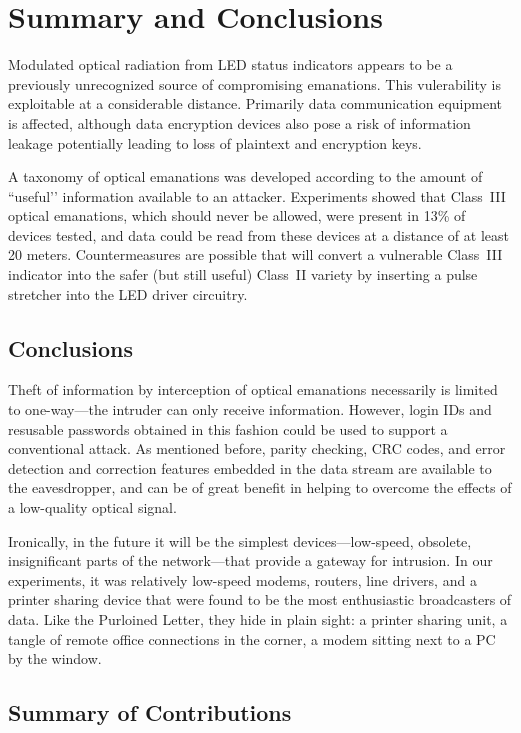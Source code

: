 \documentclass[twocolumn]{article}
\begin{document}
\section{Summary and Conclusions}

Modulated optical radiation from LED status indicators appears to be a previously unrecognized source of compromising emanations.  This vulerability is exploitable at a considerable distance.  Primarily data communication equipment is affected, although data encryption devices also pose a risk of information leakage potentially leading to loss of plaintext and encryption keys.

A taxonomy of optical emanations was developed according to the amount of ``useful’’ information available to an attacker.  Experiments showed that Class~III optical emanations, which should never be allowed, were present in 13\% of devices tested, and data could be read from these devices at a distance of at least 20 meters.  Countermeasures are possible that will convert a vulnerable Class~III indicator into the safer (but still useful) Class~II variety by inserting a pulse stretcher into the LED driver circuitry.

\subsection{Conclusions}

Theft of information by interception of optical emanations necessarily is limited to one-way---the intruder can only receive information.  However, login IDs and resusable passwords obtained in this fashion could be used to support a conventional attack.  As mentioned before, parity checking, CRC codes, and error detection and correction features embedded in the data stream are available to the eavesdropper, and can be of great benefit in helping to overcome the effects of a low-quality optical signal.

Ironically, in the future it will be the simplest devices---low-speed, obsolete, insignificant parts of the network---that provide a gateway for intrusion.  In our experiments, it was relatively low-speed modems, routers, line drivers, and a printer sharing device that were found to be the most enthusiastic broadcasters of data.  Like the Purloined Letter, they hide in plain sight: a printer sharing unit, a tangle of remote office connections in the corner, a modem sitting next to a PC by the window.

\subsection{Summary of Contributions}
\end{document}
